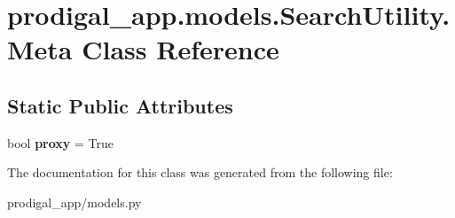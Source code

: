\hypertarget{classprodigal__app_1_1models_1_1_search_utility_1_1_meta}{}\section{prodigal\+\_\+app.\+models.\+Search\+Utility.\+Meta Class Reference}
\label{classprodigal__app_1_1models_1_1_search_utility_1_1_meta}
\subsection*{Static Public Attributes}
\begin{DoxyCompactItemize}
\item 
\mbox{\label{classprodigal__app_1_1models_1_1_search_utility_1_1_meta_ab35eacca7ec84800728df9d8660d1456}} 
bool {\bfseries proxy} = True
\end{DoxyCompactItemize}


The documentation for this class was generated from the following file\+:\begin{DoxyCompactItemize}
\item 
prodigal\+\_\+app/models.\+py\end{DoxyCompactItemize}
